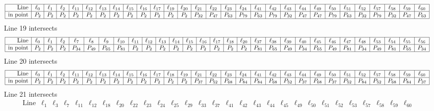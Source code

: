 \documentclass{article}
\begin{document}
{$$\begin{array}{|r*{28}{|c}|}
\hline
\mbox{Line}  & \ell_{0} & \ell_{1} & \ell_{2} & \ell_{11} & \ell_{12} & \ell_{13} & \ell_{14} & \ell_{15} & \ell_{16} & \ell_{17} & \ell_{19} & \ell_{20} & \ell_{21} & \ell_{22} & \ell_{23} & \ell_{24} & \ell_{41} & \ell_{42} & \ell_{43} & \ell_{44} & \ell_{49} & \ell_{50} & \ell_{51} & \ell_{52} & \ell_{57} & \ell_{58} & \ell_{59} & \ell_{60}\\
\hline
\mbox{in point}  & P_{2} & P_{2} & P_{2} & P_{2} & P_{2} & P_{2} & P_{2} & P_{2} & P_{2} & P_{2} & P_{2} & P_{2} & P_{32} & P_{47} & P_{63} & P_{79} & P_{63} & P_{79} & P_{32} & P_{47} & P_{47} & P_{79} & P_{63} & P_{32} & P_{79} & P_{32} & P_{47} & P_{63}\\
\hline
\end{array}
$$
Line 19 intersects 
$$
\begin{array}{|r*{28}{|c}|}
\hline
\mbox{Line}  & \ell_{0} & \ell_{1} & \ell_{2} & \ell_{7} & \ell_{8} & \ell_{9} & \ell_{10} & \ell_{11} & \ell_{12} & \ell_{13} & \ell_{14} & \ell_{15} & \ell_{16} & \ell_{17} & \ell_{18} & \ell_{20} & \ell_{37} & \ell_{38} & \ell_{39} & \ell_{40} & \ell_{45} & \ell_{46} & \ell_{47} & \ell_{48} & \ell_{53} & \ell_{54} & \ell_{55} & \ell_{56}\\
\hline
\mbox{in point}  & P_{2} & P_{2} & P_{2} & P_{34} & P_{49} & P_{65} & P_{81} & P_{2} & P_{2} & P_{2} & P_{2} & P_{2} & P_{2} & P_{2} & P_{2} & P_{2} & P_{81} & P_{65} & P_{49} & P_{34} & P_{65} & P_{49} & P_{81} & P_{34} & P_{49} & P_{81} & P_{65} & P_{34}\\
\hline
\end{array}
$$
Line 20 intersects 
$$
\begin{array}{|r*{28}{|c}|}
\hline
\mbox{Line}  & \ell_{0} & \ell_{1} & \ell_{2} & \ell_{11} & \ell_{12} & \ell_{13} & \ell_{14} & \ell_{15} & \ell_{16} & \ell_{17} & \ell_{18} & \ell_{19} & \ell_{21} & \ell_{22} & \ell_{23} & \ell_{24} & \ell_{41} & \ell_{42} & \ell_{43} & \ell_{44} & \ell_{49} & \ell_{50} & \ell_{51} & \ell_{52} & \ell_{57} & \ell_{58} & \ell_{59} & \ell_{60}\\
\hline
\mbox{in point}  & P_{2} & P_{2} & P_{2} & P_{2} & P_{2} & P_{2} & P_{2} & P_{2} & P_{2} & P_{2} & P_{2} & P_{2} & P_{37} & P_{52} & P_{68} & P_{84} & P_{84} & P_{68} & P_{52} & P_{37} & P_{68} & P_{37} & P_{52} & P_{84} & P_{52} & P_{68} & P_{84} & P_{37}\\
\hline
\end{array}
$$
Line 21 intersects 
$$
\begin{array}{|r*{28}{|c}|}
\hline
\mbox{Line}  & \ell_{1} & \ell_{3} & \ell_{7} & \ell_{11} & \ell_{12} & \ell_{18} & \ell_{20} & \ell_{22} & \ell_{23} & \ell_{24} & \ell_{25} & \ell_{29} & \ell_{33} & \ell_{37} & \ell_{41} & \ell_{42} & \ell_{43} & \ell_{44} & \ell_{45} & \ell_{49} & \ell_{50} & \ell_{51} & \ell_{52} & \ell_{53} & \ell_{57} & \ell_{58} & \ell_{59} & \ell_{60}\\

\end{array}$$}
\end{document}
